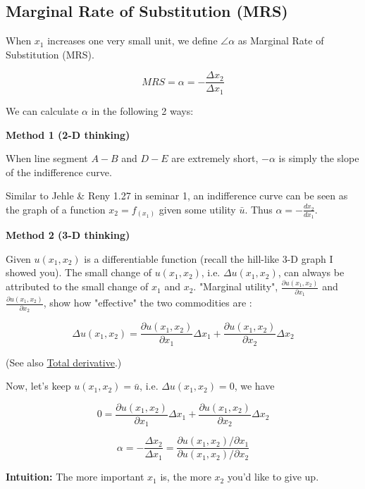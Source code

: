 \documentclass{article}
\begin{document}
\begin{mdframed}[backgroundcolor=blue!20,linecolor=white]
\section{Marginal Rate of Substitution (MRS)}

When $x_1$ increases one very small unit, we define $\angle \alpha$ as Marginal Rate of Substitution (MRS). 

$$MRS = \alpha = - \frac{\Delta x_2}{\Delta x_1}$$

We can calculate $\alpha$  in the following 2 ways:

\vspace{4mm}

\textbf{Method 1 (2-D thinking)}

When line segment $A-B$ and $D-E$ are extremely short, $- \alpha$ is simply the slope of the indifference curve.

Similar to Jehle \& Reny 1.27 in seminar 1, an indifference curve can be seen as the graph of a function $x_2 = f_(x_1)$ given some utility $\bar{u}$. Thus $\alpha = - \frac{dx_2}{dx_1}$.

\vspace{2mm}

\textbf{Method 2 (3-D thinking)}

Given $u(x_1,x_2)$ is a differentiable function (recall the hill-like 3-D graph I showed you). The small change of $u(x_1,x_2)$, i.e. $\Delta u(x_1,x_2)$, can always be attributed to the small change of $x_1$ and  $x_2$. "Marginal utility", $\frac{\partial u(x_1,x_2)}{\partial x_1}$ and $\frac{\partial u(x_1,x_2)}{\partial x_2}$, show how "effective" the two commodities are :

$$\Delta u(x_1,x_2) = \frac{\partial u(x_1,x_2)}{\partial x_1} \Delta x_1 + \frac{\partial u(x_1,x_2)}{\partial x_2} \Delta x_2$$

(See also \href{https://en.wikipedia.org/wiki/Total_derivative}{Total derivative}.)

Now, let's keep $u(x_1,x_2) = \bar{u}$, i.e. $\Delta u(x_1,x_2) = 0$, we have

$$0 = \frac{\partial u(x_1,x_2)}{\partial x_1} \Delta x_1 + \frac{\partial u(x_1,x_2)}{\partial x_2} \Delta x_2$$


$$ \alpha = - \frac{\Delta x_2}{\Delta x_1} = \frac{\partial u(x_1,x_2) / \partial x_1}{\partial u(x_1,x_2) / \partial x_2}$$

\textbf{Intuition:} The more important $x_1$ is, the more $x_2$ you'd like to give up.

\vspace{2mm}



\end{mdframed}
\end{document}
